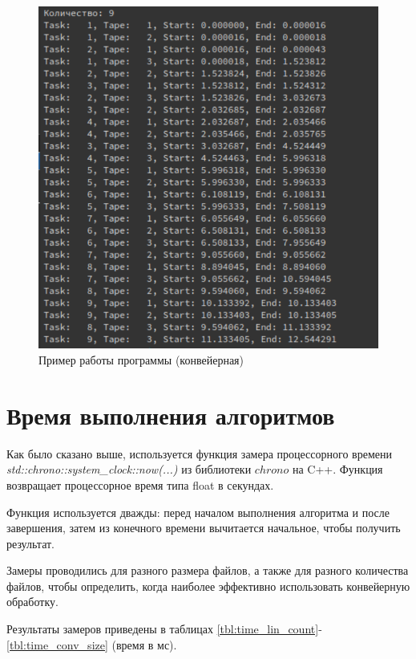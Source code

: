 \begin{figure}[h!]
	\centering
	\includegraphics[width=0.6\linewidth]{img/example_con}
	\caption{Пример работы программы (конвейерная)}
	\label{fig:example_con}
\end{figure}
\clearpage

\section{Время выполнения алгоритмов}

Как было сказано выше, используется функция замера процессорного времени \textit{std::chrono::system\_clock::now(...)} из библиотеки $chrono$ на C++. 
Функция возвращает процессорное время типа float в секундах.

Функция используется дважды: перед началом выполнения алгоритма и после завершения, затем из конечного времени вычитается начальное, чтобы получить результат.

Замеры проводились для разного размера файлов, а также для разного количества файлов, чтобы определить, когда наиболее эффективно использовать конвейерную обработку.

Результаты замеров приведены в таблицах \ref{tbl:time_lin_count}-\ref{tbl:time_conv_size} (время в мс).

